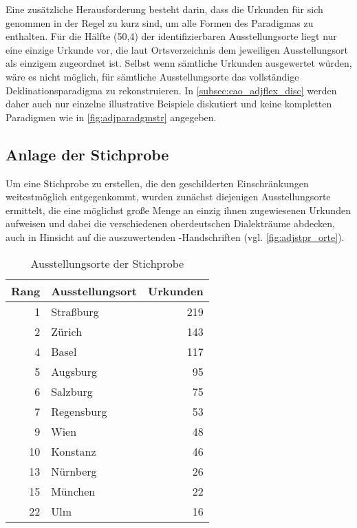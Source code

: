 Eine zusätzliche Herausforderung besteht darin, dass die Urkunden für sich
genommen in der Regel zu kurz sind, um alle Formen des Paradigmas zu enthalten.
Für die Hälfte (50,4\pct) der identifizierbaren Ausstellungs\-orte liegt nur
eine einzige Urkunde vor, die laut Ortsverzeichnis dem jeweiligen
Ausstellungs\-ort als einzigem zugeordnet ist. Selbst wenn sämtliche Urkunden
ausgewertet würden, wäre es nicht möglich, für sämtliche Ausstellungs\-orte das
vollständige Deklinationsparadigma zu rekonstruieren. In
\cref{subsec:cao_adjflex_disc} werden daher auch nur einzelne illustrative
Beispiele diskutiert und keine kompletten Paradigmen wie in
\cref{fig:adjparadgmstr} angegeben.

\subsection{Anlage der Stichprobe}
\label{subsec:cao_sample}

Um eine Stichprobe zu erstellen, die den geschilderten Einschränkungen
weitestmöglich entgegenkommt, wurden zunächst diejenigen Ausstellungs\-orte
ermittelt, die eine möglichst große Menge an einzig ihnen zugewiesenen Urkunden
aufweisen und dabei die verschiedenen oberdeutschen Dialekt\-räume abdecken,
auch in Hinsicht auf die auszuwertenden \KC{}-Handschriften (vgl.
\cref{fig:adjstpr_orte}).

\begin{table}
\centering
\caption{Ausstellungs\-orte der Stichprobe}
\begin{tabular}{r l r}
\toprule
\textbf{Rang}
	& \textbf{Ausstellungs\-ort}
	& \textbf{Urkunden}
	\\

\midrule

 1 & Straßburg  & 219 \\
 2 & Zürich     & 143 \\
 4 & Basel      & 117 \\
 5 & Augsburg   &  95 \\
 6 & Salzburg   &  75 \\
 7 & Regensburg &  53 \\
 9 & Wien       &  48 \\
10 & Konstanz	&  46 \\

\midrule

13 & Nürnberg   &  26 \\
15 & München    &  22 \\
22 & Ulm        &  16 \\

\bottomrule
\end{tabular}
\label{tab:adjstpr_orte}
\end{table}

